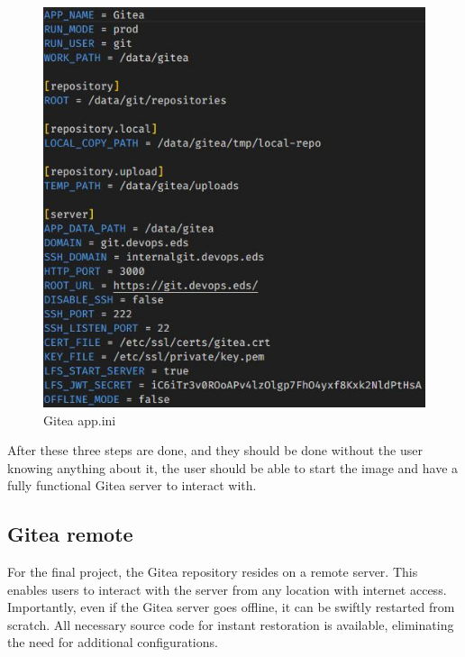 \begin{figure}
    \begin{center}
        \includegraphics[scale=.5]{images/Gitea-appin.JPG}
        \caption{Gitea app.ini}
        \label{fig:gitea_app_ini}
    \end{center}
\end{figure}

After these three steps are done, and they should be done without the user knowing anything about it, the user should be able to
start the image and have a fully functional Gitea server to interact with.

\subsection{Gitea remote}
For the final project, the Gitea repository resides on a remote server. 
This enables users to interact with the server from any location with internet access. Importantly, 
even if the Gitea server goes offline, it can be swiftly restarted from scratch. 
All necessary source code for instant restoration is available, eliminating the need for additional configurations.